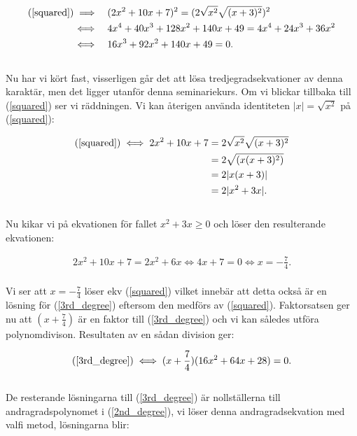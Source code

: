 \documentclass{article}
\begin{document}
\begin{align}
  \text{(\ref{squared})} \implies \quad & (2x^{2} + 10x + 7)^{2} = (2\sqrt{x^{2}}\sqrt{(x+3)^{2}})^{2} \nonumber\\
  \iff \quad & 4x^{4} + 40x^{3} + 128x^{2} + 140x + 49 = 4x^{4} + 24x^{3} + 36x^{2} \nonumber\\
  \iff \quad & 16x^{3} + 92x^{2} + 140x + 49 = 0\text{.} \label{3rd_degree}
\end{align}
\\
Nu har vi kört fast, visserligen går det att lösa tredjegradsekvationer av denna karaktär, men det ligger utanför denna seminariekurs. Om vi blickar tillbaka till (\ref{squared}) ser vi räddningen. Vi kan återigen använda identiteten $|x| = \sqrt{x^{2}}$ på (\ref{squared}):

\begin{align*}
  \text(\ref{squared}) \iff 2x^{2} + 10x + 7 &= 2\sqrt{x^{2}}\sqrt{(x+3)^{2}}\\
                        &= 2\sqrt{(x(x+3)^{2})}\\
                        &= 2|x(x+3)|\\
                        &= 2|x^{2} + 3x|\text{.}
\end{align*}
\\
Nu kikar vi på ekvationen för fallet $x^{2} + 3x \geq 0$ och löser den resulterande ekvationen:

\begin{gather*}
  2x^{2} + 10x + 7 = 2x^{2} + 6x \iff 4x + 7 = 0 \iff  x = -\frac{7}{4}\text{.}
\end{gather*}
\\
Vi ser att $x = -\frac{7}{4}$ löser ekv (\ref{squared}) vilket innebär att detta också är en lösning för (\ref{3rd_degree}) eftersom den medförs av (\ref{squared}). Faktorsatsen ger nu att $(x + \frac{7}{4})$ är en faktor till (\ref{3rd_degree}) och vi kan således utföra polynomdivison. Resultaten av en sådan division ger:

\begin{gather}
  \text{(\ref{3rd_degree})} \iff (x + \frac{7}{4})(16x^{2} + 64x + 28) = 0\text{.} \label{2nd_degree}
\end{gather}
\\
De resterande lösningarna till (\ref{3rd_degree}) är nollställerna till andragradspolynomet i (\ref{2nd_degree}), vi löser denna andragradsekvation med valfi metod, lösningarna blir:
\end{document}
